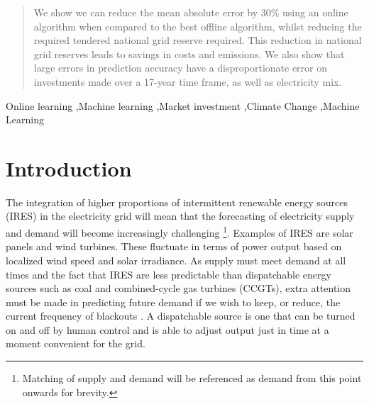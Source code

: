 \documentclass[final,3p,times,twocolumn,numbers]{elsarticle}
\begin{document}
\begin{frontmatter}
\begin{abstract}

We show we can reduce the mean absolute error by 30\% using an online algorithm when compared to the best offline algorithm, whilst reducing the required tendered national grid reserve required. This reduction in national grid reserves leads to savings in costs and emissions. We also show that large errors in prediction accuracy have a disproportionate error on investments made over a 17-year time frame, as well as electricity mix.


\end{abstract}



%
%

\begin{keyword}
Online learning \sep Machine learning \sep Market investment \sep Climate Change \sep Machine Learning


\end{keyword}

\end{frontmatter}


\section{Introduction}
\label{sec:intro}

The integration of higher proportions of intermittent renewable energy sources (IRES) in the electricity grid will mean that the forecasting of electricity supply and demand will become increasingly challenging \footnote{Matching of supply and demand will be referenced as demand from this point onwards for brevity.}. Examples of IRES are solar panels and wind turbines. These fluctuate in terms of power output based on localized wind speed and solar irradiance. As supply must meet demand at all times and the fact that IRES are less predictable than dispatchable energy sources such as coal and combined-cycle gas turbines (CCGTs), extra attention must be made in predicting future demand if we wish to keep, or reduce, the current frequency of blackouts \cite{Lu1993}. A dispatchable source is one that can be turned on and off by human control and is able to adjust output just in time at a moment convenient for the grid.
\end{document}
